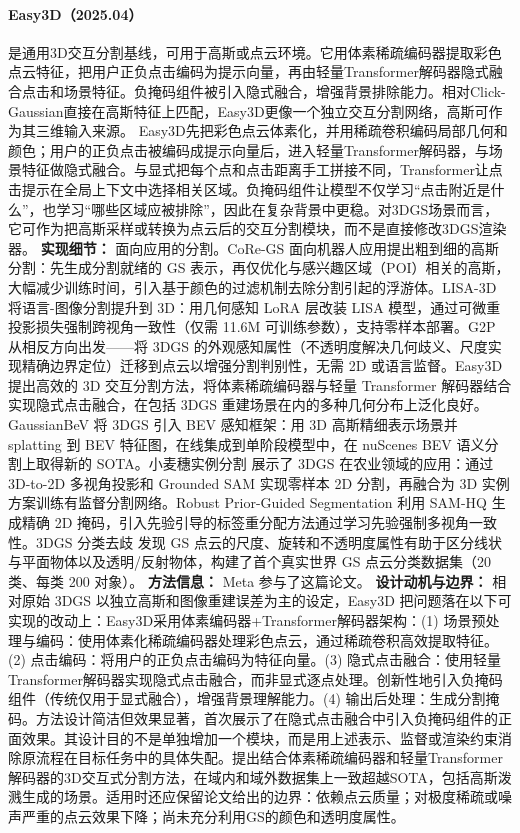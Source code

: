 \paragraph{Easy3D（2025.04）\cite{2504_11024}}
是通用3D交互分割基线，可用于高斯或点云环境。它用体素稀疏编码器提取彩色点云特征，把用户正负点击编码为提示向量，再由轻量Transformer解码器隐式融合点击和场景特征。负掩码组件被引入隐式融合，增强背景排除能力。相对Click-Gaussian直接在高斯特征上匹配，Easy3D更像一个独立交互分割网络，高斯可作为其三维输入来源。
Easy3D先把彩色点云体素化，并用稀疏卷积编码局部几何和颜色；用户的正负点击被编码成提示向量后，进入轻量Transformer解码器，与场景特征做隐式融合。与显式把每个点和点击距离手工拼接不同，Transformer让点击提示在全局上下文中选择相关区域。负掩码组件让模型不仅学习“点击附近是什么”，也学习“哪些区域应被排除”，因此在复杂背景中更稳。对3DGS场景而言，它可作为把高斯采样或转换为点云后的交互分割模块，而不是直接修改3DGS渲染器。
\textbf{实现细节：} 面向应用的分割。CoRe-GS 面向机器人应用提出粗到细的高斯分割：先生成分割就绪的 GS 表示，再仅优化与感兴趣区域（POI）相关的高斯，大幅减少训练时间，引入基于颜色的过滤机制去除分割引起的浮游体。LISA-3D 将语言-图像分割提升到 3D：用几何感知 LoRA 层改装 LISA 模型，通过可微重投影损失强制跨视角一致性（仅需 11.6M 可训练参数），支持零样本部署。G2P 从相反方向出发——将 3DGS 的外观感知属性（不透明度解决几何歧义、尺度实现精确边界定位）迁移到点云以增强分割判别性，无需 2D 或语言监督。Easy3D 提出高效的 3D 交互分割方法，将体素稀疏编码器与轻量 Transformer 解码器结合实现隐式点击融合，在包括 3DGS 重建场景在内的多种几何分布上泛化良好。GaussianBeV 将 3DGS 引入 BEV 感知框架：用 3D 高斯精细表示场景并 splatting 到 BEV 特征图，在线集成到单阶段模型中，在 nuScenes BEV 语义分割上取得新的 SOTA。小麦穗实例分割 展示了 3DGS 在农业领域的应用：通过 3D-to-2D 多视角投影和 Grounded SAM 实现零样本 2D 分割，再融合为 3D 实例方案训练有监督分割网络。Robust Prior-Guided Segmentation 利用 SAM-HQ 生成精确 2D 掩码，引入先验引导的标签重分配方法通过学习先验强制多视角一致性。3DGS 分类去歧 发现 GS 点云的尺度、旋转和不透明度属性有助于区分线状与平面物体以及透明/反射物体，构建了首个真实世界 GS 点云分类数据集（20 类、每类 200 对象）。%
\textbf{方法信息：} Meta 参与了这篇论文。
\textbf{设计动机与边界：} 相对原始 3DGS 以独立高斯和图像重建误差为主的设定，Easy3D 把问题落在以下可实现的改动上：Easy3D采用体素编码器+Transformer解码器架构：(1) 场景预处理与编码：使用体素化稀疏编码器处理彩色点云，通过稀疏卷积高效提取特征。(2) 点击编码：将用户的正负点击编码为特征向量。(3) 隐式点击融合：使用轻量Transformer解码器实现隐式点击融合，而非显式逐点处理。创新性地引入负掩码组件（传统仅用于显式融合），增强背景理解能力。(4) 输出后处理：生成分割掩码。方法设计简洁但效果显著，首次展示了在隐式点击融合中引入负掩码组件的正面效果。其设计目的不是单独增加一个模块，而是用上述表示、监督或渲染约束消除原流程在目标任务中的具体失配。提出结合体素稀疏编码器和轻量Transformer解码器的3D交互式分割方法，在域内和域外数据集上一致超越SOTA，包括高斯泼溅生成的场景。适用时还应保留论文给出的边界：依赖点云质量；对极度稀疏或噪声严重的点云效果下降；尚未充分利用GS的颜色和透明度属性。
